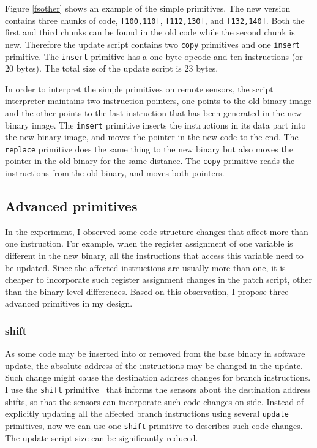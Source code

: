 Figure \ref{fsother} shows an example of the simple primitives. The new version contains three chunks of code, {\tt [100,110]}, {\tt [112,130]}, and {\tt [132,140]}. Both the first and third chunks can be found in the old code while the second chunk is new. Therefore the update script contains two {\tt copy} primitives and one {\tt insert} primitive. The {\tt insert} primitive has a one-byte opcode and ten instructions (or 20 bytes). The total size of the update script is 23 bytes.  

In order to interpret the simple primitives on remote sensors,
the script interpreter maintains two instruction pointers, one points to the old
binary image and the other points to the last instruction that has been generated
in the new binary image. 
The {\tt insert} primitive inserts the instructions
in its data part into the new binary image, and moves the pointer in the
new code to the end. The {\tt replace} primitive does the same thing to
the new binary but also moves the pointer in the old binary for the
same distance. The {\tt copy} primitive reads the instructions from the
old binary, and moves both pointers.
 
\subsection {Advanced primitives}
In the experiment, I observed some code structure changes that affect more than one instruction. For example, when the register assignment of one variable is different in the new binary, all the instructions that access this variable need to be updated. Since the affected instructions are usually more than one, it is cheaper to incorporate such register assignment changes in the patch script, other than the binary level differences. Based on this observation, I propose three advanced primitives in my design.

\subsubsection {shift}
As some code may be inserted into or removed from the base binary in software update, the absolute address of the instructions may be changed in the update. Such change might cause the destination address changes for branch instructions.  I use the {\tt shift} primitive~\cite{related:script} that informs the sensors about the destination address shifts, so that the sensors can incorporate such code changes on side. Instead of explicitly updating all the affected branch instructions using several {\tt update} primitives, now we can use one  {\tt shift} primitive to describes such code changes. The update script size can be significantly reduced. 

